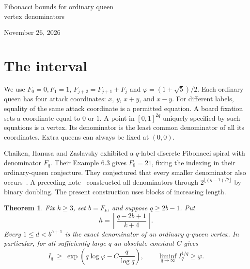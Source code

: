 \documentclass[11pt]{article}
\newtheorem{theorem}{Theorem}
\begin{document}
\begin{center}
{\LARGE Fibonacci bounds for ordinary queen\\[2pt]vertex denominators\par}
\medskip November 26, 2026
\end{center}
\begin{abstract}
Let $I_q$ be the greatest integer such that every $1\le d\le I_q$ occurs as the denominator of a vertex of the ordinary $q$-queens inside-out polytope. We prove $I_q\ge\exp(q\log\varphi-O(q/\log q))$, where $\varphi$ is the golden ratio. The interval thus reaches the exponential scale predicted in Conjecture 6.2 of Chaiken, Hanusa and Zaslavsky. Their discrete Fibonacci spiral is used as a multiplication circuit, with rational coordinates on the unit square encoding integers in a Fibonacci-number radix. The finite interval endpoint remains open. We also prove the exact maximum $F_q$ from their Conjecture 6.1 for every shape obtained by successive intersections of earlier attack lines. For ordinary semiqueens an analogous interval has exponential rate at least the plastic constant.
\end{abstract}

\section{The interval}
We use $F_0=0,F_1=1$, $F_{j+2}=F_{j+1}+F_j$ and $\varphi=(1+\sqrt5)/2$. Each ordinary queen has four attack coordinates: $x$, $y$, $x+y$, and $x-y$. For different labels, equality of the same attack coordinate is a permitted equation. A board fixation sets a coordinate equal to $0$ or $1$. A point in $[0,1]^{2q}$ uniquely specified by such equations is a vertex. Its denominator is the least common denominator of all its coordinates. Extra queens can always be fixed at $(0,0)$.

Chaiken, Hanusa and Zaslavsky exhibited a $q$-label discrete Fibonacci spiral with denominator $F_q$. Their Example 6.3 gives $F_8=21$, fixing the indexing in their ordinary-queen conjecture. They conjectured that every smaller denominator also occurs~\cite[Conj.~6.2]{chz}. A preceding note~\cite[Thm.~3]{previous} constructed all denominators through $2^{\lfloor(q-1)/2\rfloor}$ by binary doubling. The present construction uses blocks of increasing length.

\begin{theorem}\label{t:interval}
Fix $k\ge3$, set $b=F_k$, and suppose $q\ge2b-1$. Put
\[
 h=\left\lfloor\frac{q-2b+1}{k+4}\right\rfloor .
\]
Every $1\le d<b^{h+1}$ is the exact denominator of an ordinary $q$-queen vertex. In particular, for all sufficiently large $q$ an absolute constant $C$ gives
\[
 I_q\ \ge\ \exp\!\left(q\log\varphi-C\frac{q}{\log q}\right),
 \qquad \liminf_{q\to\infty} I_q^{1/q}\ge\varphi .
\]
\end{theorem}
\end{document}
